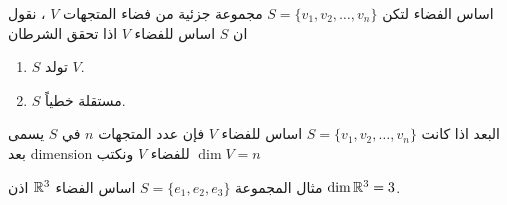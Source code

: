 \begin{frame}
	
	\pause
	\begin{exampleblock}{اساس الفضاء}
		لتكن
		$S = \{v_1, v_2, \dots, v_n\}$
		مجموعة جزئية من فضاء المتجهات $V$ ، نقول ان $S$ اساس للفضاء $V$ اذا تحقق الشرطان 
		\begin{enumerate}
			\item $S$ تولد $V$.
			\item $S$ مستقلة خطياً.
		\end{enumerate}
	\end{exampleblock}
	
	\pause
	
	\begin{exampleblock}{البعد}
		اذا كانت $S = \{v_1, v_2, \dots, v_n\}$ اساس للفضاء $V$ فإن عدد المتجهات $n$ في $S$ يسمى بعد dimension للفضاء $V$ ونكتب $\dim V = n$
	\end{exampleblock}
	
	\pause
	\begin{exampleblock}{مثال}
			المجموعة $S = \{e_1, e_2,e_3\}$ اساس الفضاء $\mathbb{R}^3$ اذن $\dim \mathbb{R}^3=3 $.
	\end{exampleblock}
\end{frame}
